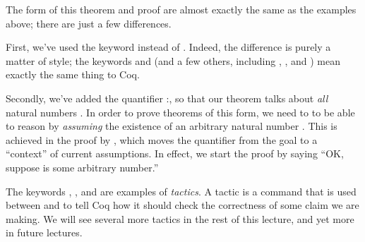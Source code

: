 \documentclass[12pt]{report}
\begin{document}
 The form of this theorem and proof are almost exactly the
    same as the examples above; there are just a few differences.


    First, we've used the keyword  instead of
    .  Indeed, the difference is purely a matter of
    style; the keywords  and  (and a few others,
    including , , and ) mean exactly the same
    thing to Coq.


    Secondly, we've added the quantifier \coqdockw{\ensuremath{\forall}} :, so that our
    theorem talks about \textit{all} natural numbers .  In order to prove
    theorems of this form, we need to to be able to reason by
    \textit{assuming} the existence of an arbitrary natural number .  This
    is achieved in the proof by  , which moves the quantifier
    from the goal to a ``context'' of current assumptions. In effect, we
    start the proof by saying ``OK, suppose  is some arbitrary number.''


    The keywords , , and  are examples of
    \textit{tactics}.  A tactic is a command that is used between  and
     to tell Coq how it should check the correctness of some
    claim we are making.  We will see several more tactics in the rest
    of this lecture, and yet more in future lectures. 
\end{document}
